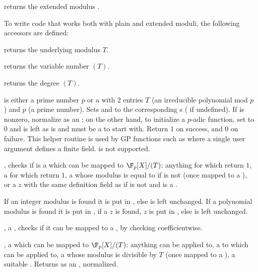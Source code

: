  returns the extended modulus .

To write code that works both with plain and extended moduli, the following
accessors are defined:

 returns the underlying modulus $T$.

 returns the variable number $(T)$.

 returns the degree $(T)$.


  is either
a prime number $p$ or a  with 2 entries $T$ (an irreducible
polynomial mod $p$) and $p$ (a prime number). Sets  and 
to the corresponding s ( if undefined). If 
is nonzero, normalize  as an ; on the other hand,
to initialize a $p$-adic function, set  to $0$ and  is left
as is and must be a  to start with. Return $1$ on success, and $0$ on
failure. This helper routine is used by GP functions such as 
where a single user argument defines a finite field.  is not
supported.

, checks if  is a 
which can be mapped to $\F_p[X]/(T)$: anything for which  return
$1$, a  for which  return $1$, a 
whose modulus is equal to  if  is not  (once mapped
to a ), or a  $z$ with the same definition field as 
if  is not  and is a .

If an integer modulus is found it is put in , else  is left
unchanged. If a polynomial modulus is found it is put in ,
if a  $z$ is found, $z$ is put in , else
 is left unchanged.

,  a ,
checks if it can be mapped to a , by checking 
coefficientwise.

,  a  which can be
mapped to $\F_p[X]/(T)$: anything  can be applied to,
a  to which  can be applied to, a 
whose modulus is divisible by $T$ (once mapped to a ), a suitable
. Returns  as an , normalized.

